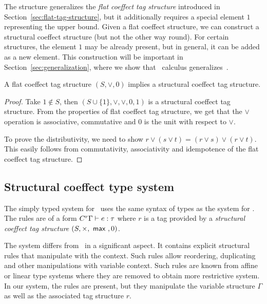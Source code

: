 The structure generalizes the \emph{flat coeffect tag structure} introduced in 
Section~\ref{sec:flat-tag-structure}, but it additionally requires a special element $1$ 
representing the upper bound. Given a flat coeffect structure, we can construct a structural
coeffect structure (but not the other way round). For certain structures, the element $1$
may be already present, but in general, it can be added as a new element.
This construction will be important in Section~\ref{sec:generalization},
where we show that \clstr~calculus generalizes~\clflt.

\begin{lemma}
\label{thm:structural-generalizaton}
A flat coeffect tag structure $(S, \vee, 0)$ implies a structural coeffect tag structure.
\end{lemma}
\begin{proof}
Take $1 \notin S$, then $(S \cup \{1\}, \vee, \vee, 0, 1)$ is a structural coeffect tag 
structure. From the properties of flat coeffect tag structure, we get that the $\vee$ operation 
is associative, commutative and $0$ is the unit with respect to $\vee$.

To prove the distributivity, we need to show $r \vee (s \vee t) = (r \vee s) \vee (r \vee t)$.
This easily follows from commutativity, associativity and idempotence of the flat coeffect tag 
structure.
\end{proof}


\subsection{Structural coeffect type system}
\label{sec:structural-types}

The simply typed system for \clstr~uses the same syntax of types as the system for \clflt. 
The rules are of a form $C^{r}\Gamma\vdash e : \tau$ where $r$ is a tag provided by 
a \emph{structural coeffect tag structure} $(S,\times, ~\textnormal{\sffamily max}~, 0)$.

The system differs from \clflt~in a significant aspect. It contains explicit 
structural rules that manipulate with the context. Such rules allow reordering, duplicating
and other manipulations with variable context. Such rules are known from affine or linear
type systems where they are removed to obtain more restrictive system. In our system, the
rules are present, but they manipulate the variable structure $\Gamma$ as well as the 
associated tag structure $r$.

